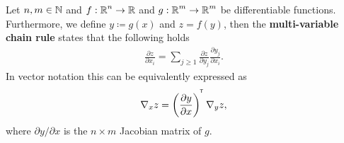\begin{theorem}\label{theorem:multi_var_chainrule}
Let $n,m\in\operatorname{\mathbb{N}}$ and $f:\operatorname{\mathbb{R}}^{n} \to \operatorname{\mathbb{R}}$ and $g:\operatorname{\mathbb{R}}^{m} \to \operatorname{\mathbb{R}}^{m}$ be differentiable functions. Furthermore, we define $y \coloneqq g(x)$ and $z=f(y)$, then the \textbf{multi-variable chain rule} states that the following holds
\begin{align*}
\frac{\partial z}{\partial x_i} = \sum_{j\geq 1} \frac{\partial z}{\partial y_j} \frac{\partial y_j}{\partial x_i}.
\end{align*}
In vector notation this can be equivalently expressed as
\begin{align*}
\nabla_x z = \left( \frac{\partial y}{\partial x} \right)^{^{\mkern-1.5mu\mathsf{T}}} \nabla_{y} z,
\end{align*}
where $\partial y/\partial x$ is the $n\times m$ Jacobian matrix of $g$.
\end{theorem}


